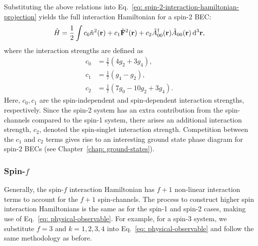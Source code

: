 Substituting the above relations into
Eq.~\eqref{eq: spin-2-interaction-hamiltonian-projection} yields the full
interaction Hamiltonian for a spin-2 BEC\@:
\begin{align}\label{eq: spin-2-interaction-hamiltonian}
    \hat{H} = \frac{1}{2}\int c_0\hat{n}^2(\vb{r}) + c_1\hat{\vb{F}}^2(\vb{r})
    + c_2\hat{A}^\dagger_{00}(\vb{r})\hat{A}_{00}(\vb{r}) \, \dd^3\vb{r},
\end{align}
where the interaction strengths are defined as
\begin{align}
    c_0 &=\frac{1}{7}\left(4g_2 + 3g_4\right), \\
    c_1 &=\frac{1}{7}\left(g_4 - g_2\right), \\
    c_2 &=\frac{1}{7}\left(7g_0 - 10g_2 + 3g_4\right).
\end{align}
Here, \(c_0, c_1\) are the spin-independent and spin-dependent interaction
strengths, respectively.
Since the spin-2 system has an extra contribution from the spin-channels
compared to the spin-1 system, there arises an additional interaction strength,
\(c_2\), denoted the spin-singlet interaction strength.
Competition between the \(c_1\) and \(c_2\) terms gives rise to an interesting
ground state phase diagram for spin-2 BECs (see
Chapter~\ref{chap: ground-states}).

\subsubsection{Spin-\(f\)}
Generally, the spin-\(f\) interaction Hamiltonian has \(f + 1\) non-linear
interaction terms to account for the \(f + 1\) spin-channels.
The process to construct higher spin interaction Hamiltonians is the same as for
the spin-1 and spin-2 cases, making use of Eq.~\eqref{eq: physical-observable}.
For example, for a spin-3 system, we substitute \(f=3\) and \(k=1,2,3,4\) into
Eq.~\eqref{eq: physical-observable} and follow the same methodology as before.

